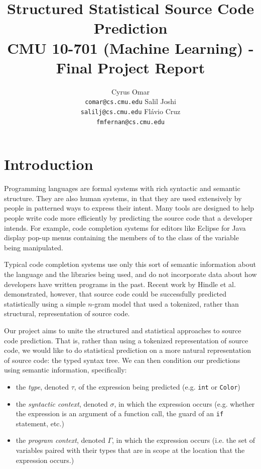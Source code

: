 \documentclass{article} %
\title{Structured Statistical Source Code Prediction\\
{\small CMU 10-701 (Machine Learning) - Final Project Report}}
\author{
  Cyrus Omar\\
  \texttt{comar@cs.cmu.edu}
  \And
  Salil Joshi\\
  \texttt{salilj@cs.cmu.edu}
  \And Fl\'avio Cruz\\
  \texttt{fmfernan@cs.cmu.edu}
}
\begin{document}
\maketitle

\section*{Introduction}
Programming languages are formal systems with rich syntactic and semantic structure. They are
also human systems, in that they are used extensively by people in patterned ways to express their
intent. Many tools are designed to help people write code more efficiently by predicting
the source code that a developer intends. For example, code completion systems for editors like Eclipse for Java display pop-up menus containing the members of to the class of the variable being manipulated. 

Typical code completion systems use only this sort of semantic
information about the language and the libraries being used, and do not incorporate data about how developers have written programs
in the past. Recent work by Hindle et al.~\cite{Hindle:2012:NS:2337223.2337322} demonstrated, however, that source code could be successfully predicted statistically
using a simple $n$-gram model that used a tokenized, rather than structural, representation of source code. 

Our project aims to unite the structured and statistical approaches to source code prediction.
That is, rather than using a tokenized representation of source code, we would like to do
statistical prediction on a more natural representation of source code: the typed syntax tree.  We can then condition our predictions using semantic information, specifically:
\begin{itemize}
\item the \emph{type}, denoted $\tau$, of the expression being predicted (e.g. \verb|int| or \verb|Color|)
\item the \emph{syntactic context}, denoted $\sigma$, in which the expression occurs (e.g. whether the expression is an argument of a function call, the guard of an \verb|if| statement, etc.)
\item the \emph{program context}, denoted $\Gamma$, in which the expression occurs (i.e. the set of variables paired with their types that are in scope at the location that the expression occurs.)
\end{itemize}
\end{document}
